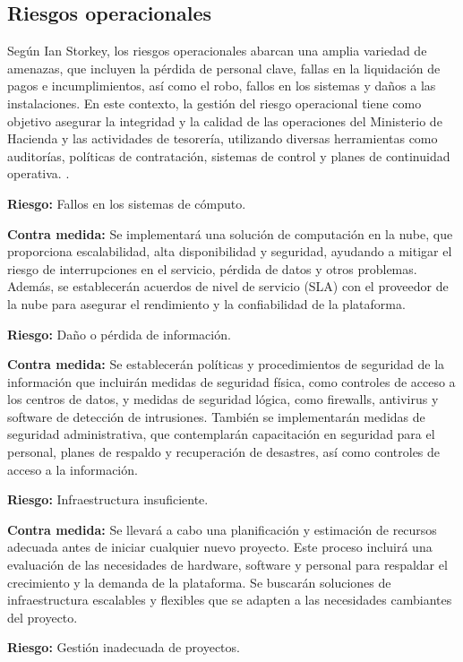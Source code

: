 
\color{red}
\subsection{Riesgos operacionales}

Según Ian Storkey, los riesgos operacionales abarcan una amplia variedad de amenazas, que incluyen la pérdida de personal clave, fallas en la liquidación de pagos e incumplimientos, así como el robo, fallos en los sistemas y daños a las instalaciones. En este contexto, la gestión del riesgo operacional tiene como objetivo asegurar la integridad y la calidad de las operaciones del Ministerio de Hacienda y las actividades de tesorería, utilizando diversas herramientas como auditorías, políticas de contratación, sistemas de control y planes de continuidad operativa. \cite{Storkey}.

\textbf{Riesgo:} Fallos en los sistemas de cómputo.

\textbf{Contra medida:} Se implementará una solución de computación en la nube, que proporciona escalabilidad, alta disponibilidad y seguridad, ayudando a mitigar el riesgo de interrupciones en el servicio, pérdida de datos y otros problemas. Además, se establecerán acuerdos de nivel de servicio (SLA) con el proveedor de la nube para asegurar el rendimiento y la confiabilidad de la plataforma.

\textbf{Riesgo:} Daño o pérdida de información.

\textbf{Contra medida:} Se establecerán políticas y procedimientos de seguridad de la información que incluirán medidas de seguridad física, como controles de acceso a los centros de datos, y medidas de seguridad lógica, como firewalls, antivirus y software de detección de intrusiones. También se implementarán medidas de seguridad administrativa, que contemplarán capacitación en seguridad para el personal, planes de respaldo y recuperación de desastres, así como controles de acceso a la información.

\textbf{Riesgo:} Infraestructura insuficiente. 

\textbf{Contra medida:} Se llevará a cabo una planificación y estimación de recursos adecuada antes de iniciar cualquier nuevo proyecto. Este proceso incluirá una evaluación de las necesidades de hardware, software y personal para respaldar el crecimiento y la demanda de la plataforma. Se buscarán soluciones de infraestructura escalables y flexibles que se adapten a las necesidades cambiantes del proyecto.

\textbf{Riesgo:} Gestión inadecuada de proyectos. 

